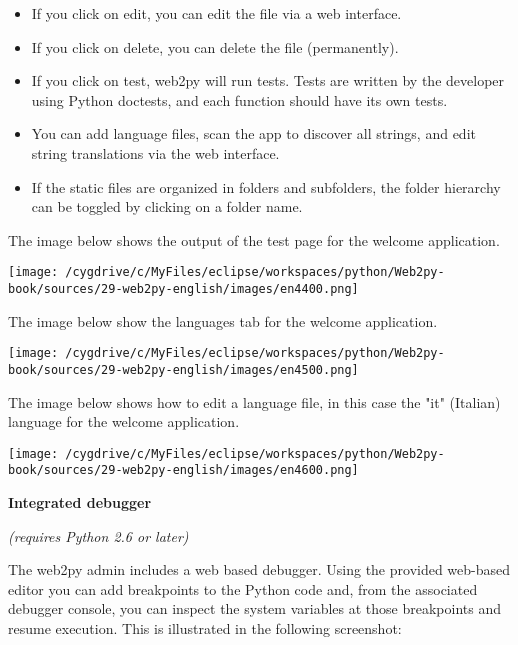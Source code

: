 \documentclass[justified,sixbynine,notoc]{tufte-book}
\begin{document}
\begin{fullwidth}
\begin{itemize}
\item If you click on edit, you can edit the file via a web interface.

\item If you click on delete, you can delete the file (permanently).

\item If you click on test, web2py will run tests. Tests are written by the developer using Python doctests, and each function should have its own tests.

\item You can add language files, scan the app to discover all strings, and edit string translations via the web interface.

\item If the static files are organized in folders and subfolders, the folder hierarchy can be toggled by clicking on a folder name.
\end{itemize}

The image below shows the output of the test page for the welcome application.


\goodbreak\begin{center}\texttt{[image: /cygdrive/c/MyFiles/eclipse/workspaces/python/Web2py-book/sources/29-web2py-english/images/en4400.png]}\end{center}


The image below show the languages tab for the welcome application.


\goodbreak\begin{center}\texttt{[image: /cygdrive/c/MyFiles/eclipse/workspaces/python/Web2py-book/sources/29-web2py-english/images/en4500.png]}\end{center}


The image below shows how to edit a language file, in this case the "it" (Italian) language for the welcome application.


\goodbreak\begin{center}\texttt{[image: /cygdrive/c/MyFiles/eclipse/workspaces/python/Web2py-book/sources/29-web2py-english/images/en4600.png]}\end{center}


{\bf Integrated debugger}

{\it (requires Python 2.6 or later)}

The web2py admin includes a web based debugger. Using the provided web-based editor you can add breakpoints to the Python code and, from the associated debugger console, you can inspect the system variables at those breakpoints and resume execution. This is illustrated in the following screenshot:



\end{fullwidth}
\end{document}
